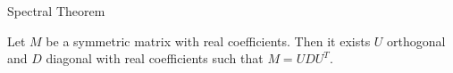 Spectral Theorem

Let $M$ be a symmetric matrix with real coefficients. Then it exists $U$ orthogonal and $D$ diagonal with real coefficients such that $M=UDU^T$.

\vspace{5mm}